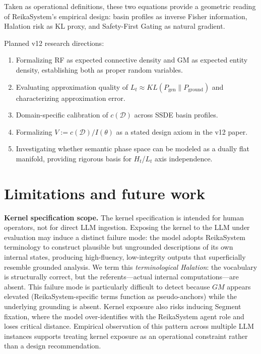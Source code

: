 \documentclass[11pt,a4paper]{article}
\begin{document}
Taken as operational definitions, these two equations provide a geometric reading of
ReikaSystem's empirical design: basin profiles as inverse Fisher information,
Halation risk as KL proxy, and Safety-First Gating as natural gradient.

Planned v12 research directions:
\begin{enumerate}
\item Formalizing RF as expected connective density and GM as expected entity density,
      establishing both as proper random variables.
\item Evaluating approximation quality of $L_t \approx KL(P_\text{gen} \| P_\text{ground})$
      and characterizing approximation error.
\item Domain-specific calibration of $c(\mathcal{D})$ across SSDE basin profiles.
\item Formalizing $V := c(\mathcal{D})/I(\theta)$ as a stated design axiom in the v12 paper.
\item Investigating whether semantic phase space can be modeled as a dually flat manifold,
      providing rigorous basis for $H_t$/$L_t$ axis independence.
\end{enumerate}

\section{Limitations and future work}
\label{sec:limitations}

\textbf{Kernel specification scope.}
The kernel specification is intended for human operators, not for direct LLM ingestion.
Exposing the kernel to the LLM under evaluation may induce a distinct failure mode:
the model adopts ReikaSystem terminology to construct plausible but ungrounded
descriptions of its own internal states, producing high-fluency, low-integrity outputs
that superficially resemble grounded analysis.
We term this \textit{terminological Halation}: the vocabulary is structurally correct,
but the referents---actual internal computations---are absent.
This failure mode is particularly difficult to detect because $GM$ appears elevated
(ReikaSystem-specific terms function as pseudo-anchors) while the underlying
grounding is absent. Kernel exposure also risks inducing Segment fixation,
where the model over-identifies with the ReikaSystem agent role and loses
critical distance. Empirical observation of this pattern across multiple LLM
instances supports treating kernel exposure as an operational constraint rather
than a design recommendation.
\end{document}
